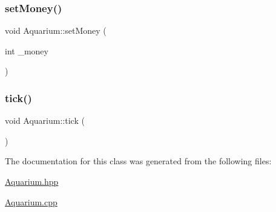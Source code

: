 \mbox{\label{class_aquarium_a6a29945548af2f7cdf9b6cb07e83b41f}} 
\subsubsection{\texorpdfstring{set\+Money()}{setMoney()}}
{\footnotesize\ttfamily void Aquarium\+::set\+Money (\begin{DoxyParamCaption}\item[{int}]{\+\_\+money }\end{DoxyParamCaption})}

\mbox{\label{class_aquarium_a99572f6fe551c4ae73ca5150f6e2f111}} 
\subsubsection{\texorpdfstring{tick()}{tick()}}
{\footnotesize\ttfamily void Aquarium\+::tick (\begin{DoxyParamCaption}{ }\end{DoxyParamCaption})}



The documentation for this class was generated from the following files\+:\begin{DoxyCompactItemize}
\item 
\mbox{\hyperlink{_aquarium_8hpp}{Aquarium.\+hpp}}\item 
\mbox{\hyperlink{_aquarium_8cpp}{Aquarium.\+cpp}}\end{DoxyCompactItemize}
